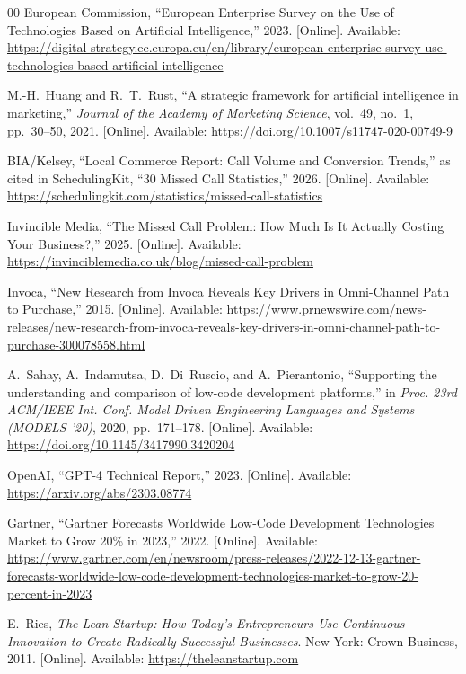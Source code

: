 \documentclass[conference]{IEEEtran}
\begin{document}
\begin{thebibliography}{00}
 European Commission, ``European Enterprise Survey on the Use of Technologies Based on Artificial Intelligence,'' 2023. [Online]. Available: \url{https://digital-strategy.ec.europa.eu/en/library/european-enterprise-survey-use-technologies-based-artificial-intelligence}

 M.-H.~Huang and R.~T.~Rust, ``A strategic framework for artificial intelligence in marketing,'' \textit{Journal of the Academy of Marketing Science}, vol.~49, no.~1, pp.~30--50, 2021. [Online]. Available: \url{https://doi.org/10.1007/s11747-020-00749-9}

 BIA/Kelsey, ``Local Commerce Report: Call Volume and Conversion Trends,'' as cited in SchedulingKit, ``30 Missed Call Statistics,'' 2026. [Online]. Available: \url{https://schedulingkit.com/statistics/missed-call-statistics}

 Invincible Media, ``The Missed Call Problem: How Much Is It Actually Costing Your Business?,'' 2025. [Online]. Available: \url{https://invinciblemedia.co.uk/blog/missed-call-problem}

 Invoca, ``New Research from Invoca Reveals Key Drivers in Omni-Channel Path to Purchase,'' 2015. [Online]. Available: \url{https://www.prnewswire.com/news-releases/new-research-from-invoca-reveals-key-drivers-in-omni-channel-path-to-purchase-300078558.html}

 A.~Sahay, A.~Indamutsa, D.~Di~Ruscio, and A.~Pierantonio, ``Supporting the understanding and comparison of low-code development platforms,'' in \textit{Proc. 23rd ACM/IEEE Int. Conf. Model Driven Engineering Languages and Systems (MODELS '20)}, 2020, pp.~171--178. [Online]. Available: \url{https://doi.org/10.1145/3417990.3420204}

 OpenAI, ``GPT-4 Technical Report,'' 2023. [Online]. Available: \url{https://arxiv.org/abs/2303.08774}

 Gartner, ``Gartner Forecasts Worldwide Low-Code Development Technologies Market to Grow 20\% in 2023,'' 2022. [Online]. Available: \url{https://www.gartner.com/en/newsroom/press-releases/2022-12-13-gartner-forecasts-worldwide-low-code-development-technologies-market-to-grow-20-percent-in-2023}

 E.~Ries, \textit{The Lean Startup: How Today's Entrepreneurs Use Continuous Innovation to Create Radically Successful Businesses}. New York: Crown Business, 2011. [Online]. Available: \url{https://theleanstartup.com}


\end{thebibliography}
\end{document}
